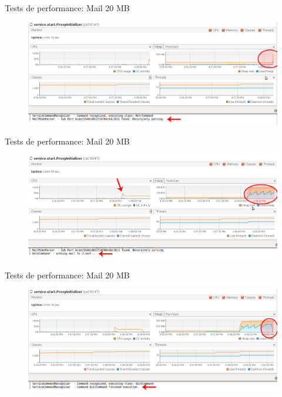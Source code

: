 \documentclass{beamer}
\begin{document}
\begin{frame}{Tests de performance: Mail 20 MB}
\begin{figure}[H]
\begin{center}
\includegraphics[scale=0.26]{images/Stat2.png}
\label{stats2}
\end{center}
\end{figure}   
\end{frame}

\begin{frame}{Tests de performance: Mail 20 MB}
\begin{figure}[H]
\begin{center}
\includegraphics[scale=0.26]{images/Stat3.png}
\label{stats3}
\end{center}
\end{figure}   
\end{frame}

\begin{frame}{Tests de performance: Mail 20 MB}
\begin{figure}[H]
\begin{center}
\includegraphics[scale=0.26]{images/Stat4.png}
\label{stats4}
\end{center}
\end{figure}   
\end{frame}
\end{document}
